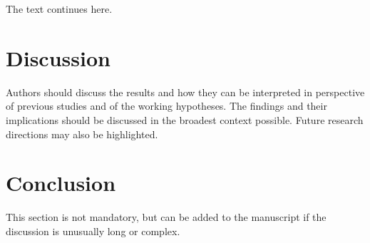 \documentclass[
]{article}
\begin{document}
The text continues here.

\hypertarget{discussion}{%
\section{Discussion}\label{discussion}}

Authors should discuss the results and how they can be interpreted in
perspective of previous studies and of the working hypotheses. The findings and
their implications should be discussed in the broadest context possible. Future
research directions may also be highlighted.

\hypertarget{conclusion}{%
\section{Conclusion}\label{conclusion}}

This section is not mandatory, but can be added to the manuscript if the
discussion is unusually long or complex.
\end{document}
